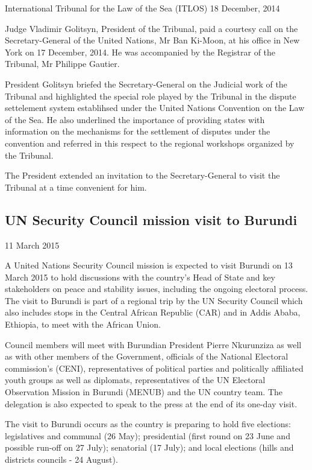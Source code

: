 \documentclass[
  openany]{book}
\begin{document}
International Tribunal for the Law of the Sea (ITLOS)
18 December, 2014

Judge Vladimir Golitsyn, President of the Tribunal, paid a courtesy call on the Secretary-General of the United Nations, Mr Ban Ki-Moon, at his office in New York on 17 December, 2014. He was accompanied by the Registrar of the Tribunal, Mr Philippe Gautier.

President Golitsyn briefed the Secretary-General on the Judicial work of the Tribunal and highlighted the special role played by the Tribunal in the dispute settelement system establihsed under the United Nations Convention on the Law of the Sea. He also underlined the importance of providing states with information on the mechanisms for the settlement of disputes under the convention and referred in this respect to the regional workshops organized by the Tribunal.

The President extended an invitation to the Secretary-General to visit the Tribunal at a time convenient for him.

\hypertarget{un-security-council-mission-visit-to-burundi}{%
\subsection{UN Security Council mission visit to Burundi}\label{un-security-council-mission-visit-to-burundi}}

11 March 2015

A United Nations Security Council mission is expected to visit Burundi on 13 March 2015 to hold discussions with the country's Head of State and key stakeholders on peace and stability issues, including the ongoing electoral process. The visit to Burundi is part of a regional trip by the UN Security Council which also includes stops in the Central African Republic (CAR) and in Addis Ababa, Ethiopia, to meet with the African Union.

Council members will meet with Burundian President Pierre Nkurunziza as well as with other members of the Government, officials of the National Electoral commission's (CENI), representatives of political parties and politically affiliated youth groups as well as diplomats, representatives of the UN Electoral Observation Mission in Burundi (MENUB) and the UN country team. The delegation is also expected to speak to the press at the end of its one-day visit.

The visit to Burundi occurs as the country is preparing to hold five elections: legislatives and communal (26 May); presidential (first round on 23 June and possible run-off on 27 July); senatorial (17 July); and local elections (hills and districts councils - 24 August).
\end{document}
